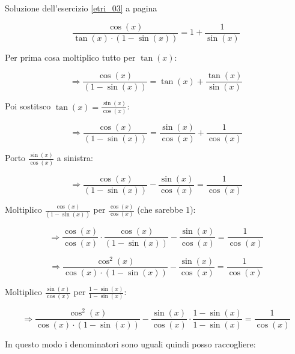 \begin{minipage}{\textwidth}
Soluzione dell'esercizio \ref{etri_03} a pagina \pageref{etri_03}\label{stri_03}


\begin{equation*}
\frac{
\cos(x)
}{
\tan(x)\cdot\left(1-\sin(x)\right)
} = 1+\frac{1}{\sin(x)}
\end{equation*}


Per prima cosa moltiplico tutto per $\tan(x)$:

\begin{equation*}
\Rightarrow\frac{
\cos(x)
}{
\left(1-\sin(x)\right)
} = \tan(x)+\frac{\tan(x)}{\sin(x)}
\end{equation*}

Poi sostitsco $\tan(x)=\frac{\sin(x)}{\cos(x)}$:


\begin{equation*}
\Rightarrow\frac{
\cos(x)
}{
\left(1-\sin(x)\right)
} = \frac{\sin(x)}{\cos(x)}+\frac{1}{\cos(x)}
\end{equation*}

Porto $\frac{\sin(x)}{\cos(x)}$ a sinistra:

\begin{equation*}
\Rightarrow\frac{
\cos(x)
}{
\left(1-\sin(x)\right)
} 
-
\frac{\sin(x)}{\cos(x)}
= \frac{1}{\cos(x)}
\end{equation*}

Moltiplico $\frac{
\cos(x)
}{
\left(1-\sin(x)\right)
}$ per $\frac{\cos(x)}{\cos(x)}$ (che sarebbe $1$):

\begin{equation*}
\Rightarrow
\frac{\cos(x)}{\cos(x)}
\cdot
\frac{
\cos(x)
}{
\left(1-\sin(x)\right)
} 
-
\frac{\sin(x)}{\cos(x)}
= \frac{1}{\cos(x)}
\end{equation*}

\begin{equation*}
\Rightarrow
\frac{\cos^2(x)}{\cos(x)
\cdot
\left(1-\sin(x)\right)
} 
-
\frac{\sin(x)}{\cos(x)}
= \frac{1}{\cos(x)}
\end{equation*}

Moltiplico $\frac{\sin(x)}{\cos(x)}$ per $\frac{1-\sin(x)}{1-\sin(x)}$:

\begin{equation*}
\Rightarrow
\frac{\cos^2(x)}{\cos(x)
\cdot
\left(1-\sin(x)\right)
} 
-
\frac{\sin(x)}{\cos(x)}
\cdot
\frac{1-\sin(x)}{1-\sin(x)}
= \frac{1}{\cos(x)}
\end{equation*}

In questo modo i denominatori sono uguali quindi posso raccogliere:


\end{minipage}
